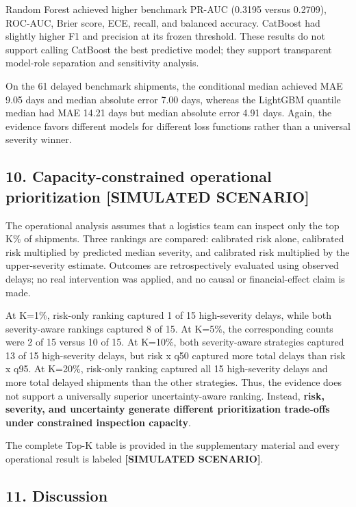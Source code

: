 \documentclass[
]{article}
\begin{document}
Random Forest achieved higher benchmark PR-AUC (0.3195 versus 0.2709),
ROC-AUC, Brier score, ECE, recall, and balanced accuracy. CatBoost had
slightly higher F1 and precision at its frozen threshold. These results
do not support calling CatBoost the best predictive model; they support
transparent model-role separation and sensitivity analysis.

On the 61 delayed benchmark shipments, the conditional median achieved
MAE 9.05 days and median absolute error 7.00 days, whereas the LightGBM
quantile median had MAE 14.21 days but median absolute error 4.91 days.
Again, the evidence favors different models for different loss functions
rather than a universal severity winner.

\subsection{10. Capacity-constrained operational prioritization
{[}SIMULATED
SCENARIO{]}}\label{capacity-constrained-operational-prioritization-simulated-scenario}

The operational analysis assumes that a logistics team can inspect only
the top K\% of shipments. Three rankings are compared: calibrated risk
alone, calibrated risk multiplied by predicted median severity, and
calibrated risk multiplied by the upper-severity estimate. Outcomes are
retrospectively evaluated using observed delays; no real intervention
was applied, and no causal or financial-effect claim is made.

At K=1\%, risk-only ranking captured 1 of 15 high-severity delays, while
both severity-aware rankings captured 8 of 15. At K=5\%, the
corresponding counts were 2 of 15 versus 10 of 15. At K=10\%, both
severity-aware strategies captured 13 of 15 high-severity delays, but
risk x q50 captured more total delays than risk x q95. At K=20\%,
risk-only ranking captured all 15 high-severity delays and more total
delayed shipments than the other strategies. Thus, the evidence does not
support a universally superior uncertainty-aware ranking. Instead,
\textbf{risk, severity, and uncertainty generate different
prioritization trade-offs under constrained inspection capacity}.

The complete Top-K table is provided in the supplementary material and
every operational result is labeled \textbf{{[}SIMULATED SCENARIO{]}}.

\subsection{11. Discussion}\label{discussion}
\end{document}

